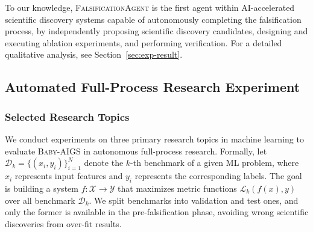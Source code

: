 \documentclass{article} %
\newcommand{\AIGS}{AIGS\xspace}
\newcommand{\AIGSSys}{\textsc{Baby-AIGS}\xspace}
\newcommand{\FalsificationAgent}{\textsc{FalsificationAgent}\xspace}
\newcommand{\DSL}{\textsc{DSL}\xspace}
\begin{document}
\vspace{0.5em}

To our knowledge, \FalsificationAgent is the first agent within AI-accelerated scientific discovery systems capable of autonomously completing the falsification process, by independently proposing scientific discovery candidates, designing and executing ablation experiments, and performing verification. For a detailed qualitative analysis, see Section~\ref{sec:exp-result}. 




\subsection{Automated Full-Process Research Experiment}
\label{sec:exp-setup}

\subsubsection{Selected Research Topics}

We conduct experiments on three primary research topics in machine learning to evaluate \AIGSSys in autonomous full-process research. Formally, let $ \mathcal{D}_k = \{ (x_i, y_i) \}_{i=1}^N $ denote the $k$-th benchmark of a given ML problem, where $ x_i $ represents input features and $ y_i $ represents the corresponding labels. The goal is building a system $ f: \mathcal{X} \rightarrow \mathcal{Y} $ that maximizes metric functions $ \mathcal{L}_k(f(x), y) $ over all benchmark $ \mathcal{D}_k $. We split benchmarks into validation and test ones, and only the former is available in the pre-falsification phase, avoiding wrong scientific discoveries from over-fit results. 
\end{document}

